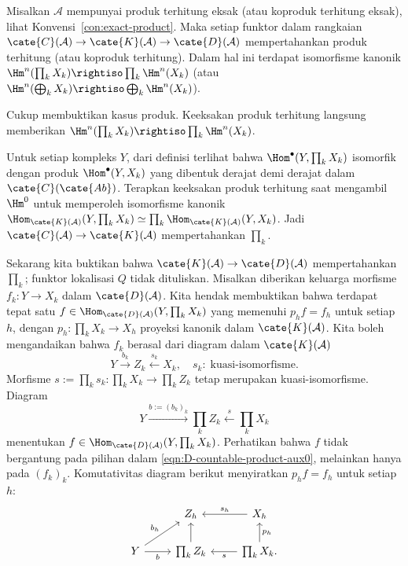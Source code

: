 \begin{lema}\label{prop:D-countable-product}
	Misalkan $\mathcal{A}$ mempunyai produk terhitung eksak (atau koproduk
	terhitung eksak), lihat Konvensi~\ref{con:exact-product}. Maka setiap funktor
	dalam rangkaian
	$\cate{C}(\mathcal{A})\to\cate{K}(\mathcal{A})\to\cate{D}(\mathcal{A})$
	mempertahankan produk terhitung (atau koproduk terhitung). Dalam hal ini
	terdapat isomorfisme kanonik
	$\Hm^n(\prod_kX_k)\rightiso\prod_k\Hm^n(X_k)$ (atau
	$\Hm^n(\bigoplus_kX_k)\rightiso\bigoplus_k\Hm^n(X_k)$).
\end{lema}
\begin{bukti}
	Cukup membuktikan kasus produk. Keeksakan produk terhitung langsung memberikan
	$\Hm^n(\prod_kX_k)\rightiso\prod_k\Hm^n(X_k)$.

	Untuk setiap kompleks $Y$, dari definisi terlihat bahwa
	$\Hom^\bullet(Y,\prod_kX_k)$ isomorfik dengan produk
	$\Hom^\bullet(Y,X_k)$ yang dibentuk derajat demi derajat dalam
	$\cate{C}(\cate{Ab})$. Terapkan keeksakan produk terhitung saat mengambil
	$\Hm^0$ untuk memperoleh isomorfisme kanonik
	$\Hom_{\cate{K}(\mathcal{A})}(Y,\prod_kX_k)\simeq
	\prod_k\Hom_{\cate{K}(\mathcal{A})}(Y,X_k)$. Jadi
	$\cate{C}(\mathcal{A})\to\cate{K}(\mathcal{A})$ mempertahankan $\prod_k$.

	Sekarang kita buktikan bahwa
	$\cate{K}(\mathcal{A})\to\cate{D}(\mathcal{A})$ mempertahankan $\prod_k$;
	funktor lokalisasi $Q$ tidak dituliskan. Misalkan diberikan keluarga morfisme
	$f_k:Y\to X_k$ dalam $\cate{D}(\mathcal{A})$. Kita hendak membuktikan bahwa
	terdapat tepat satu
	$f\in\Hom_{\cate{D}(\mathcal{A})}(Y,\prod_kX_k)$ yang memenuhi
	$p_hf=f_h$ untuk setiap $h$, dengan
	$p_h:\prod_kX_k\to X_h$ proyeksi kanonik dalam $\cate{K}(\mathcal{A})$.
	Kita boleh mengandaikan bahwa $f_k$ berasal dari diagram dalam
	$\cate{K}(\mathcal{A})$
	\begin{equation}\label{eqn:D-countable-product-aux0}
		Y \xrightarrow{b_k} Z_k \xleftarrow{s_k} X_k, \quad s_k:\; \text{kuasi-isomorfisme}.
	\end{equation}
	Morfisme
	$s:=\prod_ks_k:\prod_kX_k\to\prod_kZ_k$ tetap merupakan kuasi-isomorfisme.
	Diagram
	\[ Y \xrightarrow{b := (b_k)_k} \prod_k Z_k \xleftarrow{s} \prod_k X_k \]
	menentukan $f\in\Hom_{\cate{D}(\mathcal{A})}(Y,\prod_kX_k)$. Perhatikan
	bahwa $f$ tidak bergantung pada pilihan dalam
	\eqref{eqn:D-countable-product-aux0}, melainkan hanya pada $(f_k)_k$.
	Komutativitas diagram berikut menyiratkan $p_hf=f_h$ untuk setiap $h$:
	\[\begin{tikzcd}
		& Z_h & X_h \arrow[l, "s_h"'] \\
		Y \arrow[r, "b"'] \arrow[ru, "b_h"] & \prod_k Z_k \arrow[u] & \prod_k X_k \arrow[l, "s"] \arrow[u, "p_h"'] .
	\end{tikzcd} \]


\end{bukti}
